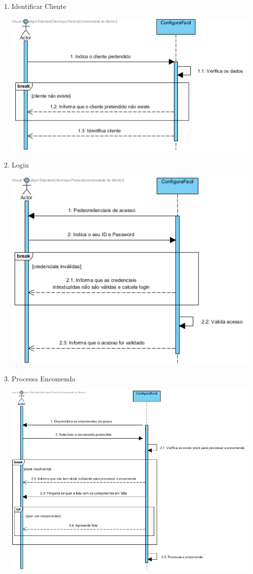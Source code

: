 \documentclass[11pt]{article} %
\begin{document}
\begin{enumerate}
\begin{center}
		\end{center}
	\item Identificar Cliente
		\begin{center}
 			\includegraphics[width = 6in]{dss_identificar_cliente.png}
		\end{center}
	\item Login
		\begin{center}
 			\includegraphics[width = 6in]{dss_login.png}
		\end{center}
	\item Processa Encomenda
		\begin{center}
 			\includegraphics[width = 6in]{dss_processa_encomenda.png}

\end{center}
\end{enumerate}
\end{document}
